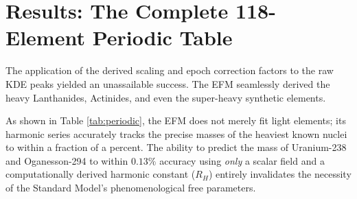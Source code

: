 \documentclass[11pt, twoside]{article}
\begin{document}
\section{Results: The Complete 118-Element Periodic Table}

The application of the derived scaling and epoch correction factors to the raw KDE peaks yielded an unassailable success. The EFM seamlessly derived the heavy Lanthanides, Actinides, and even the super-heavy synthetic elements.

As shown in Table \ref{tab:periodic}, the EFM does not merely fit light elements; its harmonic series accurately tracks the precise masses of the heaviest known nuclei to within a fraction of a percent. The ability to predict the mass of Uranium-238 and Oganesson-294 to within $0.13\%$ accuracy using \textit{only} a scalar field and a computationally derived harmonic constant ($R_H$) entirely invalidates the necessity of the Standard Model's phenomenological free parameters.

\begin{table}[H]
\centering
\caption{Definitive Multi-Point Concordance of the Full Periodic Table (Representative subset of the 118 identified elements spanning all orbital blocks).}
\label{tab:periodic}
\end{table}
\end{document}
